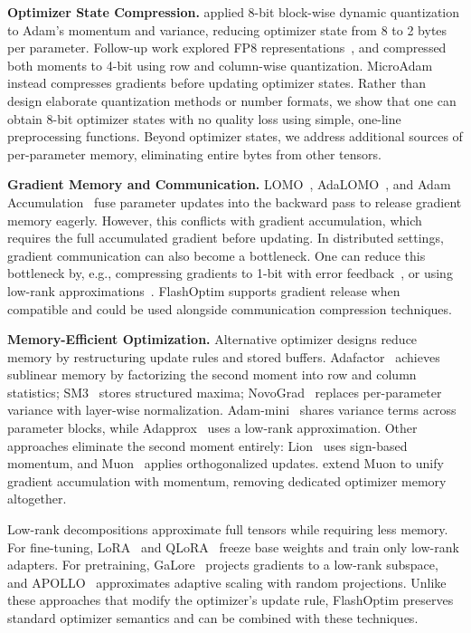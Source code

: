 \documentclass[10pt,twocolumn,letterpaper]{article}
\theoremstyle{plain}
\theoremstyle{definition}
\theoremstyle{remark}
\newcommand{\flashOptim}{FlashOptim\xspace}
\begin{document}
\textbf{Optimizer State Compression.}
\citet{dettmers2022optimizers} applied 8-bit block-wise dynamic quantization to Adam's momentum and variance, reducing optimizer state from 8 to 2 bytes per parameter.
Follow-up work explored FP8 representations~\citep{peng2023fp8lm,xi2025coat,fishman2024scaling}, and \citet{li2023memory} compressed both moments to 4-bit using row and column-wise quantization.
MicroAdam~\citep{modoranu2024microadam} instead compresses gradients before updating optimizer states. Rather than design elaborate quantization methods or number formats, we show that one can obtain 8-bit optimizer states with no quality loss using simple, one-line preprocessing functions.
Beyond optimizer states, we address additional sources of per-parameter memory, eliminating entire bytes from other tensors.


\textbf{Gradient Memory and Communication.}
LOMO~\citep{lv2024lomo}, AdaLOMO~\citep{lv2024adalomo}, and Adam Accumulation~\citep{zhang2023adam} fuse parameter updates into the backward pass to release gradient memory eagerly. However, this conflicts with gradient accumulation, which requires the full accumulated gradient before updating.
In distributed settings, gradient communication can also become a bottleneck. One can reduce this bottleneck by, e.g., compressing gradients to 1-bit with error feedback~\citep{tang20211bit}, or using low-rank approximations~\citep{vogels2019powersgd}.
\flashOptim supports gradient release when compatible and could be used alongside communication compression techniques.


\textbf{Memory-Efficient Optimization.}
Alternative optimizer designs reduce memory by restructuring update rules and stored buffers.
Adafactor~\citep{shazeer2018adafactor} achieves sublinear memory by factorizing the second moment into row and column statistics; SM3~\citep{anil2019memory} stores structured maxima; NovoGrad~\citep{ginsburg2019stochastic} replaces per-parameter variance with layer-wise normalization.
Adam-mini~\citep{zhang2025adammini} shares variance terms across parameter blocks, while Adapprox~\citep{zhao2024adapprox} uses a low-rank approximation.
Other approaches eliminate the second moment entirely: Lion~\citep{chen2023lion} uses sign-based momentum, and Muon~\citep{jordan2024muon,liu2025muon} applies orthogonalized updates.
\citet{pethick2025training} extend Muon to unify gradient accumulation with momentum, removing dedicated optimizer memory altogether.

Low-rank decompositions approximate full tensors while requiring less memory. 
For fine-tuning, LoRA~\citep{hu2022lora} and QLoRA~\citep{dettmers2023qlora} freeze base weights and train only low-rank adapters.
For pretraining, GaLore~\citep{zhao2024galore} projects gradients to a low-rank subspace, and APOLLO~\citep{zhu2025apollo} approximates adaptive scaling with random projections.
Unlike these approaches that modify the optimizer's update rule, \flashOptim preserves standard optimizer semantics and can be combined with these techniques.
\end{document}
